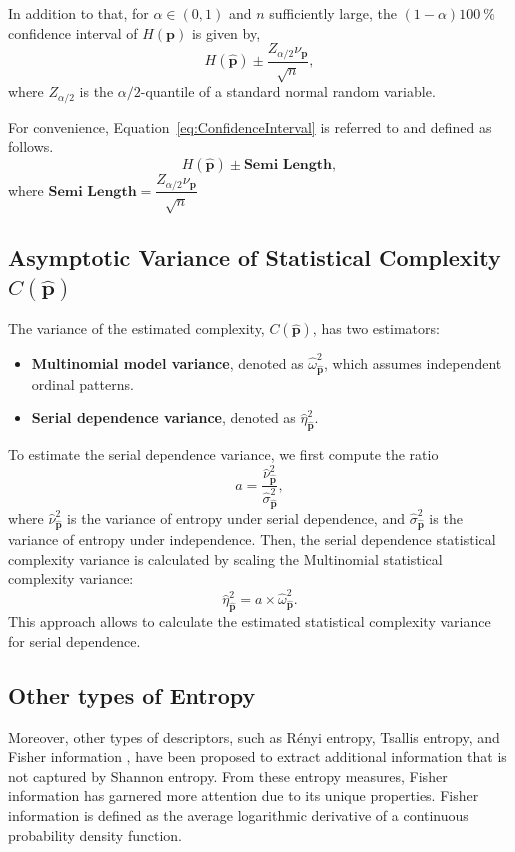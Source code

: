 In addition to that, for $\alpha\in(0,1)$ and $n$ sufficiently large, the $(1-\alpha)\SI{100}{\percent}$ confidence interval of $H(\mathbf{p})$ is given by, 
\begin{equation}
  H(\widehat{\mathbf{p}})\pm \dfrac{Z_{\alpha/2}\nu_{\mathbf{p}}}{\sqrt{n}},
  \label{eq:ConfidenceInterval}
\end{equation} 
where $Z_{\alpha/2}$ is the $\alpha/2$-quantile of a standard normal random variable.

For convenience, Equation~\ref{eq:ConfidenceInterval} is referred to and defined as follows.
\begin{equation}
	H(\widehat{\mathbf{p}})\pm \textbf{Semi Length},
	\label{eq:CI}
\end{equation} 
where $\textbf{Semi Length}=\dfrac{Z_{\alpha/2}\nu_{\mathbf{p}}}{\sqrt{n}}$

\subsection{Asymptotic Variance of Statistical Complexity $C(\widehat{\mathbf{p}})$}\label{Subsec:AsympVarComplexity}
The variance of the estimated complexity, $C(\widehat{\mathbf{p}})$, has two estimators:
\begin{itemize}
	\item \textbf{Multinomial model variance}, denoted as $\widehat{\omega}^2_{\widehat{\mathbf{p}}}$, which assumes independent ordinal patterns.
	\item \textbf{Serial dependence variance}, denoted as $\widehat{\eta}^2_{\widehat{\mathbf{p}}}$.
\end{itemize}
To estimate the serial dependence variance, we first compute the ratio
$$
a = \dfrac{\widehat{\nu}^2_{\widehat{\mathbf{p}}}}{\widehat{\sigma}^2_{\widehat{\mathbf{p}}}},
$$
where $\widehat{\nu}^2_{\widehat{\mathbf{p}}}$ is the variance of entropy under serial dependence, and $\widehat{\sigma}^2_{\widehat{\mathbf{p}}}$ is the variance of entropy under independence.
Then, the serial dependence statistical complexity variance is calculated by scaling the Multinomial statistical complexity variance:
\[
\widehat{\eta}^2_{\widehat{\mathbf{p}}} = a \times \widehat{\omega}^2_{\widehat{\mathbf{p}}}.
\]
This approach allows to calculate the estimated statistical complexity variance for serial dependence.


\subsection{Other types of Entropy}
Moreover, other types of descriptors, such as Rényi entropy\cite{renyi1961measures}, Tsallis entropy\cite{tsallis1988possible}, and Fisher information \cite{frieden2004science}, have been proposed to extract additional information that is not captured by Shannon entropy.
From these entropy measures, Fisher information has garnered more attention due to its unique properties. Fisher information is defined as the average logarithmic derivative of a continuous probability density function.

